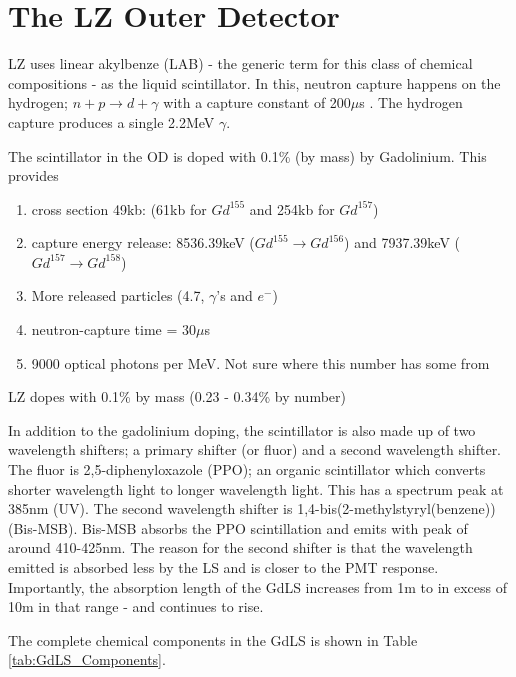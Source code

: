 \section{The LZ Outer Detector} \label{OD_info}

\par
LZ uses linear akylbenze (LAB) - the generic term for this class of chemical compositions - as the liquid scintillator.
In this, neutron capture happens on the hydrogen; $n + p \xrightarrow{} d + \gamma$ with a capture constant of 200$\mu$s \cite{LZ_TechnicalDesignReview_ref}.
The hydrogen capture produces a single 2.2MeV $\gamma$.
\par
The scintillator in the OD is doped with 0.1\% (by mass) by Gadolinium.
This provides 

\begin{enumerate}
    \item cross section 49kb: (61kb for $Gd^{155}$ and 254kb for $Gd^{157}$)
    \item capture energy release: 8536.39keV ($Gd^{155} \xrightarrow{} Gd^{156}$) and 7937.39keV ($Gd^{157} \xrightarrow{} Gd^{158}$)
    \item More released particles (4.7, $\gamma$'s and $e^{-}$)
    \item neutron-capture time = 30$\mu$s
    \item 9000 optical photons per MeV. Not sure where this number has some from
\end{enumerate}

\par
LZ dopes with 0.1\% by mass (0.23 - 0.34\% by number)

\par
In addition to the gadolinium doping, the scintillator is also made up of two wavelength shifters; a primary shifter (or fluor) and a second wavelength shifter.
The fluor is 2,5-diphenyloxazole (PPO); an organic scintillator which converts shorter wavelength light to longer wavelength light. 
This has a spectrum peak at 385nm (UV).
The second wavelength shifter is 1,4-bis(2-methylstyryl(benzene)) (Bis-MSB). 
Bis-MSB absorbs the PPO scintillation and emits with peak of around 410-425nm.
The reason for the second shifter is that the wavelength emitted is absorbed less by the LS and is closer to the PMT response.
Importantly, the absorption length of the GdLS increases from 1m to in excess of 10m in that range - and continues to rise.

\par
The complete chemical components in the GdLS is shown in Table \ref{tab:GdLS_Components}.

